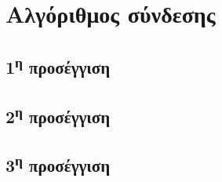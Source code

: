 

% 
\gr
\section{Αλγόριθμος σύνδεσης}

\subsection{1\textsuperscript{η} προσέγγιση}
\subsection{2\textsuperscript{η} προσέγγιση}
\subsection{3\textsuperscript{η} προσέγγιση}

% 